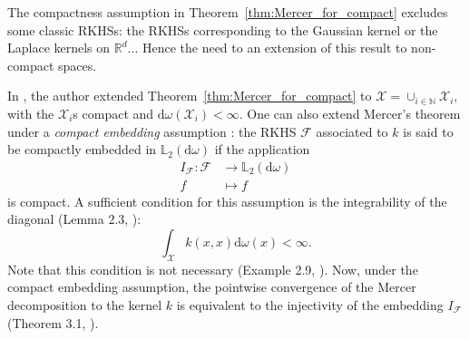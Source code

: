 \documentclass[twoside,11pt]{book}
\newtheorem{theorem}{Theorem}
\begin{document}
The compactness assumption in Theorem~\ref{thm:Mercer_for_compact} excludes some classic RKHSs: the RKHSs corresponding to the Gaussian kernel or the Laplace kernels on $\mathbb{R}^{d}$...
Hence the need to an extension of this result to non-compact spaces.

In \cite{Sun05}, the author extended Theorem~\ref{thm:Mercer_for_compact} to $\mathcal{X} = \cup_{i \in \mathbb{N}} \mathcal{X}_{i}$, with the $\mathcal{X}_{i}$s compact and $\mathrm{d}\omega(\mathcal{X}_{i})<\infty$. One can also extend Mercer's theorem under a \textit{compact embedding} assumption \citep{StSc12}: the RKHS $\mathcal{F}$ associated to $k$ is said to be compactly embedded in $\mathbb{L}_{2}(\mathrm{d}\omega)$ if the application
\begin{align*}
  I_{\mathcal{F}}: \mathcal{F}&\longrightarrow \mathbb{L}_{2}(\mathrm{d}\omega) \\
  f &\longmapsto f
\end{align*}
is compact.
A sufficient condition for this assumption is the integrability of the diagonal (Lemma 2.3, \citep{StSc12}):
\begin{equation}
\int_{\mathcal{X}} k(x,x) \mathrm{d}\omega(x) < \infty.
\end{equation}
Note that this condition is not necessary (Example 2.9, \citep{StSc12}). Now, under the compact embedding assumption, the pointwise convergence of the Mercer decomposition to the kernel $k$ is equivalent to the injectivity of the embedding $I_{\mathcal{F}}$ (Theorem 3.1, \citep{StSc12}).
\end{document}
